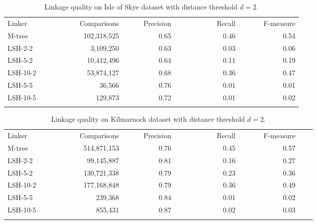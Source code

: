 \documentclass{llncs}
\begin{document}
\begin{table}[t]
\caption{Linkage quality on Isle of Skye dataset with distance threshold $d=2$.}
\label{comparison-of-results-demography-skye}
\centering
\begin{footnotesize}
\begin{tabular}{lrrrr} \hline\noalign{\smallskip}
Linker~~~~~~~~~~ & ~~~Comparisons & ~~~~~Precision & ~~~~~~~~~~~Recall & ~~~~~~F-measure \\
\noalign{\smallskip} \hline \noalign{\smallskip}
M-tree   & 102,318,525 & 0.65 & 0.46 & 0.54 \\
\noalign{\smallskip} \hline \noalign{\smallskip}
LSH-2-2  &   3,109,250 & 0.63 & 0.03 & 0.06 \\
LSH-5-2  &  10,412,496 & 0.64 & 0.11 & 0.19 \\
LSH-10-2 &  53,874,127 & 0.68 & 0.36 & 0.47 \\
LSH-5-5  &      36,566 & 0.76 & 0.01 & 0.01 \\
LSH-10-5 &     129,873 & 0.72 & 0.01 & 0.02 \\
\noalign{\smallskip} \hline
\end{tabular}
\end{footnotesize}
\end{table}


\begin{table}[t]
\caption{Linkage quality on Kilmarnock dataset with distance threshold $d=2$.}
\label{comparison-of-results-demography-kili}
\centering
\begin{footnotesize}
\begin{tabular}{lrrrrrr} \hline\noalign{\smallskip}
Linker~~~~~~~~~~ & ~~~Comparisons & ~~~~~Precision & ~~~~~~~~~~~Recall & ~~~~~~F-measure \\
\noalign{\smallskip} \hline \noalign{\smallskip}
M-tree   & 514,871,153 & 0.76 & 0.45 & 0.57 \\
\noalign{\smallskip} \hline \noalign{\smallskip}
LSH-2-2  &  99,145,887 & 0.81 & 0.16 & 0.27 \\
LSH-5-2  & 130,721,338 & 0.79 & 0.23 & 0.36 \\
LSH-10-2 & 177,168,848 & 0.79 & 0.36 & 0.49 \\
LSH-5-5  &     239,368 & 0.84 & 0.01 & 0.02 \\
LSH-10-5 &     855,431 & 0.87 & 0.02 & 0.03 \\ 
\noalign{\smallskip} \hline
\end{tabular}
\end{footnotesize}
\end{table}
\end{document}
